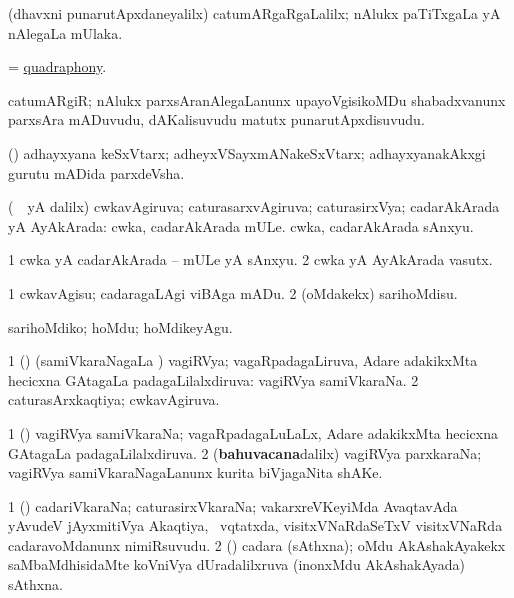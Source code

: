 \bentry
{}
\gl{\kirxvi}
\bmng
(dhavxni punarutApxdaneyalilx) catumARgaRgaLalilx; nAlukx paTiTxgaLa yA nAlegaLa mUlaka. 
\emng
\eentry

\bentry
{}
\gl{\nA}
\bmng
= \hyperlink{quadraphony}{quadraphony}. 
\emng
\eentry

\bentry
{}
\gl{\nA}
\bmng
catumARgiR; nAlukx parxsAranAlegaLanunx upayoV\-gisikoMDu shabadxvanunx parxsAra mADuvudu, dAKalisuvudu matutx punarutApxdisuvudu. 
\emng
\eentry

\bentry
{}
\gl{\nA}
\bmng
(\pari) adhayxyana keSxVtarx; adheyxVSayxmANakeSxVtarx; adhayx\-yanakAkxgi gurutu mADida parxdeVsha. 
\emng
\eentry

\bentry
{}
\gl{\gu}
\bmng
(\kanmu\ \aMrashA\ yA \pArxvi dalilx) cwkavA\-giruva; caturasarxvAgiruva; caturasirxVya; cadarAkArada yA AyAkArada:   cwka, cadarAkArada mULe.   cwka, cadarAkArada sAnxyu. 
\emng
\eentry

\bentry
{}
\gl{\nA}
\bmng
\bnum
\num{1} cwka yA cadarAkArada -- mULe yA sAnxyu. 
\num{2} cwka yA AyAkArada vasutx. 
\enum
\emng
\eentry

\bentry
{}
\gl{\sakirx}
\bmng
\bnum
\num{1} cwkavAgisu; cadaragaLAgi viBAga mADu. 
\num{2} (oMdakekx) sarihoMdisu. 
\enum
\emng

\noindent
\gl{\akirx}
\expl{}
\bmng
sarihoMdiko; hoMdu; hoMdikeyAgu. 
\emng
\eentry

\bentry
{}
\gl{\gu}
\bmng
\bnum
\num{1} (\ga) (samiVkaraNagaLa \vi) vagiRVya; vagaR\-padagaLiruva, Adare adakikxMta hecicxna GAtagaLa padagaLilalxdiruva:   vagiRVya samiVkaraNa. 
\num{2} caturasArxkaqtiya; cwkavAgiruva. 
\enum
\emng
\eentry

\bentry
{}
\gl{\nA}
\bmng
\bnum
\num{1} (\ga) vagiRVya samiVkaraNa; vagaRpadagaLuLaLx, Adare adakikxMta hecicxna GAtagaLa padagaLilalxdiruva. 
\num{2} (\textbf{bahuvacana}dalilx) vagiRVya parxkaraNa; vagiRVya samiVkaraNagaLanunx kurita biVjagaNita shAKe. 
\enum
\emng
\eentry

\bentry
{}
\gl{\nA}
\bmng
\bnum
\num{1} (\ga) cadariVkaraNa; caturasirxVkaraNa; vakarxreVKeyiMda AvaqtavAda yAvudeV jAyxmitiVya Akaqtiya, \kanmu\ vqtatxda, visitxVNaRdaSeTxV visitxVNaRda cadaravoMdanunx nimiRsuvudu. 
\num{2} (\Kavi) cadara (sAthxna); oMdu AkAshakAyakekx saMbaMdhisidaMte  koVniVya dUradalilxruva (inonxMdu AkAshakAyada) sAthxna. 
\enum
\emng
\eentry

